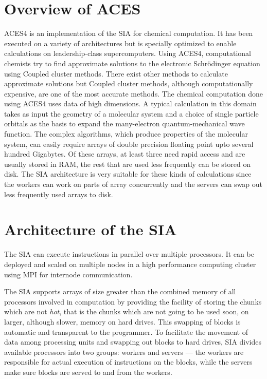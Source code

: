 \section{Overview of ACES}
ACES4 is an implementation of the SIA for chemical computation. It has been executed
on a variety of architectures but is specially optimized to enable
calculations on leadership-class supercomputers. Using ACES4, computational chemists
try to find approximate solutions to the electronic Schrödinger equation using Coupled cluster
methods. There exist other methods to calculate approximate solutions but Coupled
cluster methods, although computationally expensive, are one of the most accurate methods.
The chemical computation done using ACES4 uses data of high dimensions. A typical calculation in this domain
takes as input the geometry of a molecular system and a choice of single
particle orbitals as the basis to expand the many-electron quantum-mechanical wave
function. The complex algorithms, which produce properties of the molecular
system, can easily require arrays of double precision floating point upto
several hundred Gigabytes. Of these arrays, at least three need rapid access and
are usually stored in RAM, the rest that are used less frequently can be stored
on disk. The SIA architecture is very suitable for these kinds of calculations since
the workers can work on parts of array concurrently and the servers can swap out
less frequently used arrays to disk.

\section{Architecture of the SIA}\label{siaarch}
The SIA can execute instructions in parallel over multiple processors. It can be
deployed and scaled on multiple nodes in a high performance computing cluster
using MPI for internode communication.

The SIA supports arrays of size greater than the combined memory of all processors
involved in computation by providing the facility of storing the chunks which are
not \textit{hot}, that is the chunks which are not going to be used soon, on
larger, although slower, memory on hard drives. This swapping of blocks is automatic
and transparent to the programmer. To facilitate the movement of data among
processing units and swapping out blocks to hard drives, SIA divides available
processors into two groups: workers and servers --- the workers are responsible for
actual execution of instructions on the blocks, while the servers make sure blocks
are served to and from the workers.

